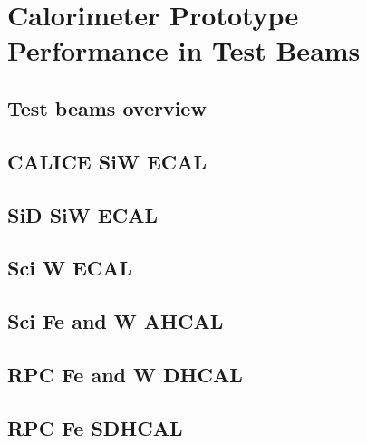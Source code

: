 \chapter{Calorimeter Prototype Performance in Test Beams}

\section{Test beams overview}

\section{CALICE SiW ECAL}

\section{SiD SiW ECAL}

\section{Sci W ECAL}

\section{Sci Fe and W AHCAL}

\section{RPC Fe and W DHCAL}

\section{RPC Fe SDHCAL}